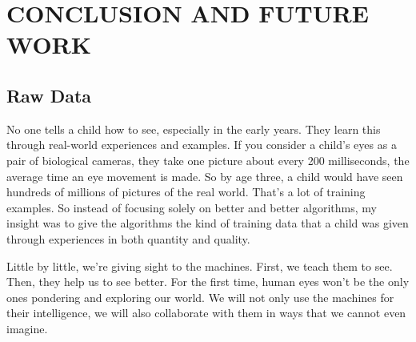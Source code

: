 \chapter{CONCLUSION AND FUTURE WORK} 
\label{chap:concl}
\section{Raw Data}
No one tells a child how to see, especially in the early years. They learn this through real-world experiences and examples. If you consider a child's eyes as a pair of biological cameras, they take one picture about every 200 milliseconds, the average time an eye movement is made. So by age three, a child would have seen hundreds of millions of pictures of the real world. That's a lot of training examples. So instead of focusing solely on better and better algorithms, my insight was to give the algorithms the kind of training data that a child was given through experiences in both quantity and quality.


Little by little, we're giving sight to the machines. First, we teach them to see. Then, they help us to see better. For the first time, human eyes won't be the only ones pondering and exploring our world. We will not only use the machines for their intelligence, we will also collaborate with them in ways that we cannot even imagine. 
